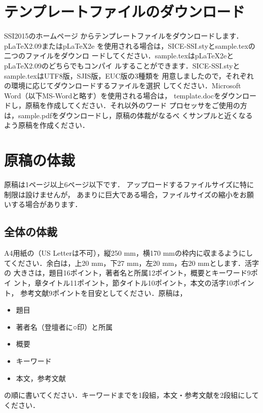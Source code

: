 \documentclass{jarticle}
\begin{document}
\section{テンプレートファイルのダウンロード}

SSI2015のホームページ\cite{大会ホームページ}
からテンプレートファイルをダウンロードします．pLaTeX2.09またはpLaTeX2e
を使用される場合は，SICE-SSI.styとsample.texの二つのファイルをダウンロ
ードしてください．sample.texはpLaTeX2eとpLaTeX2.09のどちらでもコンパイ
ルすることができます．SICE-SSI.styとsample.texはUTF8版，SJIS版，EUC版の3種類を
用意しましたので，それぞれの環境に応じてダウンロードするファイルを選択
してください．Microsoft Word（以下MS-Wordと略す）を使用される場合は，
template.docをダウンロードし，原稿を作成してください．それ以外のワード
プロセッサをご使用の方は，sample.pdfをダウンロードし，原稿の体裁がなるべ
くサンプルと近くなるよう原稿を作成ください．

\section{原稿の体裁}

原稿は1ページ以上6ページ以下です．
アップロードするファイルサイズに特に制限は設けませんが，
あまりに巨大である場合，ファイルサイズの縮小をお願いする場合があります．

\subsection{全体の体裁}

A4用紙の（US Letterは不可），縦250 mm，横170 mmの枠内に収まるようにし
てください．余白は，上20 mm，下27 mm，左20 mm，右20 mmとします．活字の
大きさは，題目16ポイント，著者名と所属12ポイント，概要とキーワード9ポイ
ント，章タイトル11ポイント，節タイトル10ポイント，本文の活字10ポイント，
参考文献9ポイントを目安としてください．原稿は，
%
\begin{itemize}
  \setlength{\topsep}{0pt}
  \setlength{\partopsep}{0pt}
  \setlength{\itemsep}{0pt}
  \setlength{\parsep}{0pt}
  \setlength{\parskip}{1pt plus 1pt minus 1pt}
  \item 題目
  \item 著者名（登壇者に○印）と所属
  \item 概要
  \item キーワード
  \item 本文，参考文献
\end{itemize}
%
の順に書いてください．キーワードまでを1段組，本文・参考文献を2段組にしてください． 
\end{document}

